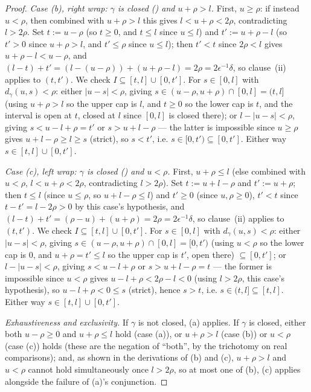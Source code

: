 \begin{proof}
  \emph{Case (b), right wrap: $\gamma$ is closed () and $u+\rho>l$.} First,
  $u \geq \rho$: if instead $u<\rho$, then combined with $u+\rho>l$ this gives $l < u+\rho < 2\rho$,
  contradicting $l>2\rho$. Set $t:=u-\rho$ (so $t\geq0$, and $t\leq l$ since $u\leq l$) and
  $t':=u+\rho-l$ (so $t'>0$ since $u+\rho>l$, and $t'\leq\rho$ since $u\leq l$); then $t'<t$ since
  $2\rho<l$ gives $u+\rho-l<u-\rho$, and $(l-t)+t' = (l-(u-\rho)) + (u+\rho-l) = 2\rho =
  2\epsilon^{-1}\delta$, so clause~(ii) applies to $(t,t')$. We check $I \subseteq [t,l]\cup[0,t']$.
  For $s\in[0,l]$ with $d_\gamma(u,s)<\rho$: either $|u-s|<\rho$, giving $s \in
  (u-\rho,u+\rho)\cap[0,l] = (t,l]$ (using $u+\rho>l$ so the upper cap is $l$, and $t\geq0$ so the
  lower cap is $t$, and the interval is open at $t$, closed at $l$ since $[0,l]$ is closed there);
  or $l-|u-s|<\rho$, giving $s<u-l+\rho=t'$ or $s>u+l-\rho$ — the latter is impossible since
  $u\geq\rho$ gives $u+l-\rho\geq l\geq s$ (strict), so $s<t'$, i.e. $s\in[0,t')\subseteq[0,t']$.
  Either way $s\in[t,l]\cup[0,t']$.

  \emph{Case (c), left wrap: $\gamma$ is closed () and $u<\rho$.} First,
  $u+\rho\leq l$ (else combined with $u<\rho$, $l<u+\rho<2\rho$, contradicting $l>2\rho$). Set
  $t:=u+l-\rho$ and $t':=u+\rho$; then $t \leq l$ (since $u\leq\rho$, so $u+l-\rho\leq l$) and $t'
  \geq 0$ (since $u,\rho \geq 0$), $t'<t$ since $t-t' = l-2\rho>0$ by this case's hypothesis, and
  $(l-t)+t' = (\rho-u)+(u+\rho)=2\rho=2\epsilon^{-1}\delta$, so clause~(ii) applies to $(t,t')$. We
  check $I\subseteq[t,l]\cup[0,t']$. For $s\in[0,l]$ with $d_\gamma(u,s)<\rho$: either $|u-s|<\rho$,
  giving $s \in (u-\rho,u+\rho)\cap[0,l] = [0,t')$ (using $u<\rho$ so the lower cap is $0$, and
  $u+\rho=t'\leq l$ so the upper cap is $t'$, open there) $\subseteq [0,t']$; or $l-|u-s|<\rho$,
  giving $s<u-l+\rho$ or $s>u+l-\rho=t$ — the former is impossible since $u<\rho$ gives
  $u-l+\rho<2\rho-l<0$ (using $l>2\rho$, this case's hypothesis), so $u-l+\rho<0\leq s$ (strict),
  hence $s>t$, i.e. $s\in(t,l]\subseteq[t,l]$. Either way $s\in[t,l]\cup[0,t']$.

  \emph{Exhaustiveness and exclusivity.} If $\gamma$ is not closed, (a) applies. If $\gamma$ is
  closed, either both $u-\rho\geq0$ and $u+\rho\leq l$ hold (case (a)), or $u+\rho>l$ (case (b)) or
  $u<\rho$ (case (c)) holds (these are the negation of ``both'', by the trichotomy on real
  comparisons); and, as shown in the derivations of (b) and (c), $u+\rho>l$ and $u<\rho$ cannot
  hold simultaneously once $l>2\rho$, so at most one of (b), (c) applies alongside the failure of
  (a)'s conjunction.


\end{proof}
